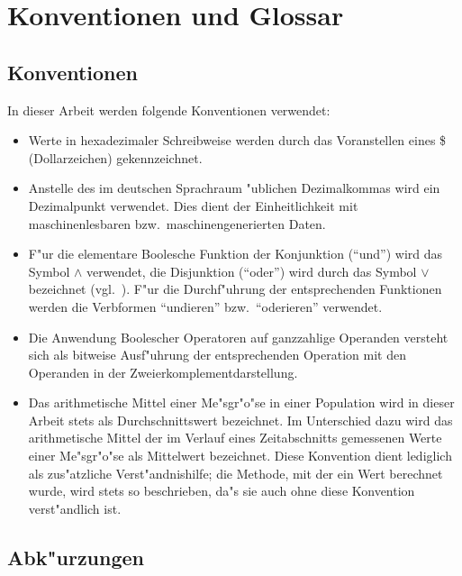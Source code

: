 \chapter{Konventionen und Glossar}
\label{preliminaries}

\section{Konventionen}
\label{conventions}

In dieser Arbeit werden folgende Konventionen verwendet:

\begin{itemize}
\item Werte in hexadezimaler Schreibweise werden durch das Voranstellen eines \$ (Dollarzeichen) gekennzeichnet.

\item Anstelle des im deutschen Sprachraum "ublichen Dezimalkommas wird ein Dezimalpunkt verwendet.
Dies dient der Einheitlichkeit mit maschinenlesbaren bzw.\ maschinengenerierten Daten.

\item F"ur die elementare Boolesche Funktion der Konjunktion ("`und"') wird das
Symbol $\wedge$ verwendet, die Disjunktion ("`oder"') wird durch das Symbol $\vee$ bezeichnet
(vgl.\ \cite{Oberschelp92}). F"ur die Durchf"uhrung der entsprechenden Funktionen werden die
Verbformen "`undieren"' bzw.\ "`oderieren"' verwendet.

\item Die Anwendung Boolescher Operatoren auf ganzzahlige Operanden versteht sich als bitweise
Ausf"uhrung der entsprechenden Operation mit den Operanden in der Zweierkomplementdarstellung.

\item Das arithmetische Mittel einer Me"sgr"o"se in einer Population wird in dieser Arbeit stets als
Durchschnittswert bezeichnet. Im Unterschied dazu wird das arithmetische Mittel der im Verlauf eines
Zeitabschnitts gemessenen Werte einer Me"sgr"o"se als Mittelwert bezeichnet. Diese Konvention dient
lediglich als zus"atzliche Verst"andnishilfe; die Methode, mit der ein Wert berechnet wurde, wird stets
so beschrieben, da"s sie auch ohne diese Konvention verst"andlich ist.

\end{itemize}

\section{Abk"urzungen}

